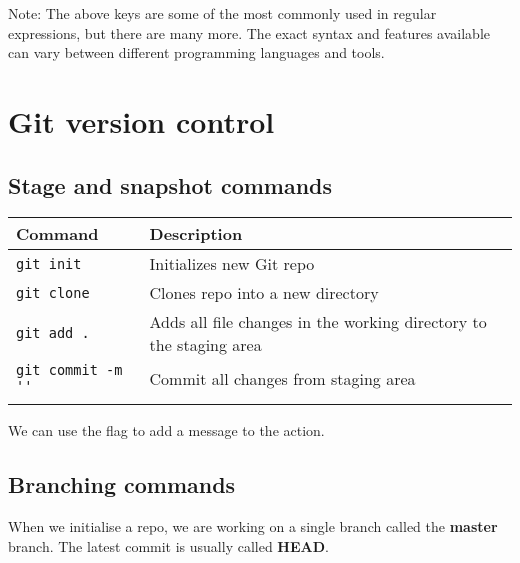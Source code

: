 \documentclass{article}
\begin{document}
Note: The above keys are some of the most commonly used in regular expressions, but there are many more. The exact syntax and features available can vary between different programming languages and tools.
\newpage
\section{Git version control}
\subsection{Stage and snapshot commands}
\begin{table}[H]
    \begin{tabular}{ll}
        \textbf{Command}             & \textbf{Description}                                               \\ \hline
        \lstinline|git init|         & Initializes new Git repo                                           \\ \arrayrulecolor{lightgray}\hline
        \lstinline|git clone|        & Clones repo into a new directory                                   \\ \arrayrulecolor{lightgray}\hline
        \lstinline|git add . |       & Adds all file changes in the working directory to the staging area \\ \arrayrulecolor{lightgray}\hline
        \lstinline|git commit -m ''| & Commit all changes from staging area                               \\ \arrayrulecolor{lightgray}\hline
    \end{tabular}
\end{table}
We can use the  flag to add a message to the action.
\subsection{Branching commands}
When we initialise a repo, we are working on a single branch called the \textbf{master} branch. The latest commit is usually called \textbf{HEAD}.
\end{document}
